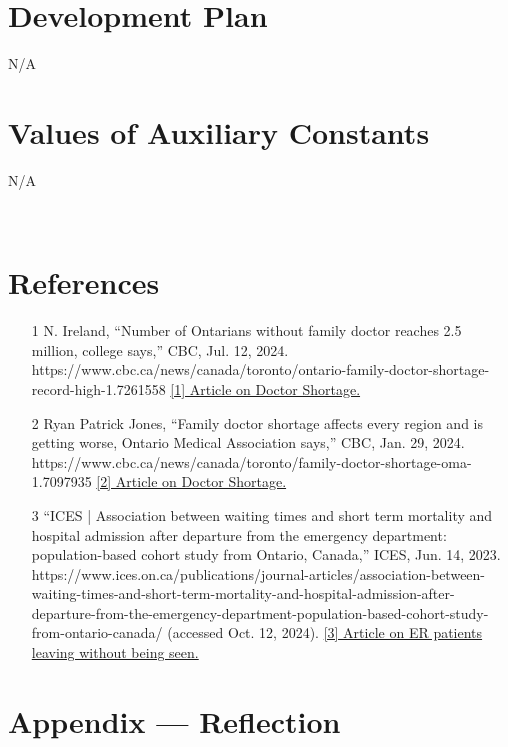 \documentclass[12pt]{article}
\begin{document}
\section{Development Plan}
N/A

\section{Values of Auxiliary Constants}
N/A


~\newpage

\section{References}


\begin{itemize}
  \item
  [1]N. Ireland, “Number of Ontarians without family doctor reaches 2.5 million, college says,” CBC, Jul. 12, 2024. https://www.cbc.ca/news/canada/toronto/ontario-family-doctor-shortage-record-high-1.7261558
  \href{https://www.cbc.ca/news/canada/toronto/ontario-family-doctor-shortage-record-high-1.7261558}{[1] Article on Doctor Shortage.}
  \item 
  [2]Ryan Patrick Jones, “Family doctor shortage affects every region and is getting worse, Ontario Medical Association says,” CBC, Jan. 29, 2024. https://www.cbc.ca/news/canada/toronto/family-doctor-shortage-oma-1.7097935
  \href{https://www.cbc.ca/news/canada/toronto/family-doctor-shortage-oma-1.7097935}{[2] Article on Doctor Shortage.}
  \item
  [3]“ICES | Association between waiting times and short term mortality and hospital admission after departure from the emergency department: population-based cohort study from Ontario, Canada,” ICES, Jun. 14, 2023. https://www.ices.on.ca/publications/journal-articles/association-between-waiting-times-and-short-term-mortality-and-hospital-admission-after-departure-from-the-emergency-department-population-based-cohort-study-from-ontario-canada/ (accessed Oct. 12, 2024).
  \href{https://www.ices.on.ca/publications/journal-articles/association-between-waiting-times-and-short-term-mortality-and-hospital-admission-after-departure-from-the-emergency-department-population-based-cohort-study-from-ontario-canada/}{[3] Article on ER patients leaving without being seen.}
\end{itemize}

\newpage{}
\section*{Appendix --- Reflection}
\end{document}
